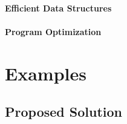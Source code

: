 \subsubsection{Efficient Data Structures} %
\label{ssub:efficient_data_structures}

\subsubsection{Program Optimization} %
\label{ssub:program_optimization}







\chapter{Examples}\label{ch:examples}
\section{Proposed Solution} %
\label{sec:proposed_solution}



